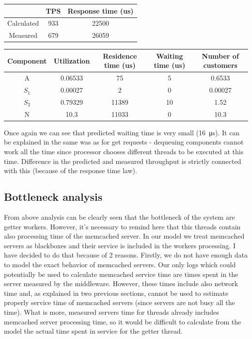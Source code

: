 \documentclass[11pt]{article}
\begin{document}
{\small
\begin{center}
\begin{tabular}{|c|c|c|}
\hline & TPS & Response time (us) \\
\hline Calculated & 933 & 22500 \\
\hline Measured & 679 & 26059 \\
\hline
\end{tabular}
\end{center}

\begin{center}
\begin{tabular}{|c|c|c|c|c|}
\hline Component & Utilization & Residence time (us) & Waiting time (us) & Number of customers\\
\hline A & 0.06533  & 75 & 5 & 0.6533 \\
\hline $S_1$ & 0.00027 & 2  & 0 & 0.00027 \\
\hline $S_2$ & 0.79329 & 11389 & 10 &1.52 \\
\hline N & 10.3 & 11033 & 0 & 10.3 \\
\hline
\end{tabular}
\end{center}
}

Once again we can see that predicted waiting time is very small (\SI{16}{\micro\second}). It can be explained in the same was as for get requests - dequeuing components cannot work all the time since processor chooses different threads to be executed at this time. Difference in the predicted and measured throughput is strictly connected with this (because of the  response time law).

\subsection{Bottleneck analysis}
\label{sec:bottleneck}

From above analysis can be clearly seen that the bottleneck of the system are getter workers. However, it's necessary to remind here that this threads contain also processing time of the memcached server. In our model we treat memcached servers as blackboxes and their service is included in the workers processing. I have decided to do that because of 2 reasons. Firstly, we do not have enough data to model the exact behavior of memcached servers. Our only logs which could potentially be used to calculate memcached service time are times spent in the server measured by the middleware. However, these times include also network time and, as explained in two previous sections, cannot be used to estimate properly service time of memcached servers (since servers are not busy all the time). What is more, measured servers time for threads already includes memcached server processing time, so it would be difficult to calculate from the model the actual time spent in service for the getter thread.
\end{document}

